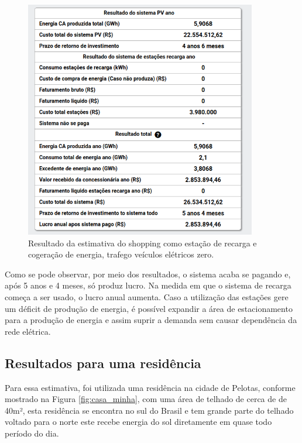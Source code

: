 \begin{figure}[H]
    \centering
    \includegraphics[width=0.9\textwidth]{./Figuras/shopping_7.png}
    \caption{Resultado da estimativa do shopping como estação de recarga e cogeração de energia, trafego veículos elétricos zero.}
   \label{fig:shopping_7}
\end{figure}

Como se pode observar, por meio dos resultados, o sistema acaba se pagando e, após 5 anos e 4 meses, só produz lucro. Na medida em que o sistema de recarga começa a ser usado, o lucro anual aumenta. Caso a utilização das estações gere um déficit de produção de energia, é possível expandir a área de estacionamento para a produção de energia e assim suprir a demanda sem causar dependência da rede elétrica.

\newpage
\subsection{Resultados para uma residência}

Para essa estimativa, foi utilizada uma residência na cidade de Pelotas, conforme mostrado na Figura \ref{fig:casa_minha}, com uma área de telhado de cerca de de 40m², esta residência se encontra no sul do Brasil e tem grande parte do telhado voltado para o norte este recebe energia do sol diretamente em quase todo período do dia.

